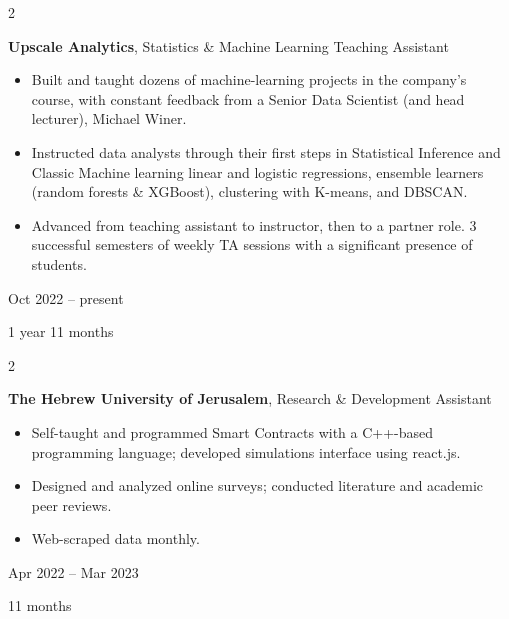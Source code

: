 \documentclass[10pt, letterpaper]{article}
\newenvironment{highlights}{
    \begin{itemize}[
        topsep=0.10 cm,
        parsep=0.10 cm,
        partopsep=0pt,
        itemsep=0pt,
        leftmargin=0.4 cm + 10pt
    ]
}{
    \end{itemize}
} %
\newenvironment{twocolentry}[2][]{
    \onecolentry
    \def\secondColumn{#2}
    \setcolumnwidth{\fill, 4.5 cm}
    \begin{paracol}{2}
}{
    \switchcolumn \raggedleft \secondColumn
    \end{paracol}
    \endonecolentry
} %
\begin{document}
        \begin{twocolentry}{
            Oct 2022 – present

        1 year 11 months
        }
            \textbf{Upscale Analytics}, Statistics \& Machine Learning Teaching Assistant
            \begin{highlights}
                \item Built and taught dozens of machine-learning projects in the company's course, with constant feedback from a Senior Data Scientist (and head lecturer), Michael Winer.
                \item Instructed data analysts through their first steps in Statistical Inference and Classic Machine learning linear and logistic regressions, ensemble learners (random forests \& XGBoost), clustering with K-means, and DBSCAN.
                \item Advanced from teaching assistant to instructor, then to a partner role. 3 successful semesters of weekly TA sessions with a significant presence of students.
            \end{highlights}
        \end{twocolentry}


        \vspace{0.2 cm}

        \begin{twocolentry}{
            Apr 2022 – Mar 2023

        11 months
        }
            \textbf{The Hebrew University of Jerusalem}, Research \& Development Assistant
            \begin{highlights}
                \item Self-taught and programmed Smart Contracts with a C++-based programming language; developed simulations interface using react.js.
                \item Designed and analyzed online surveys; conducted literature and academic peer reviews.
                \item Web-scraped data monthly.
            \end{highlights}
        \end{twocolentry}


        \vspace{0.2 cm}
\end{document}
